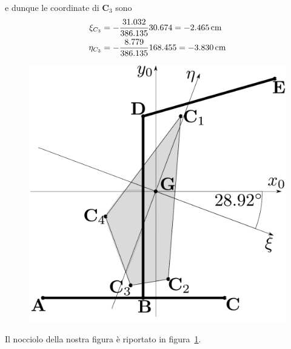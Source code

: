 e dunque le coordinate di $\mathbf{C}_3$ sono 
\begin{align*}
\xi_{C_{3}} &= -\frac{31.032}{386.135}30.674 = -2.465\,\textup{cm} \\ 
\eta_{C_{3}} &= -\frac{8.779}{386.135}168.455 = -3.830\,\textup{cm}
\end{align*}
\renewcommand{\thefigure}{6.1~-~3}
\begin{figure}[ht]
\centering
\includegraphics[width=\textwidth]{Immagini/Parte_6/Esercizio6_1/Esercizio6_1_3.pdf}
\caption{}
\label{Esercizio6-1-3}
\end{figure}
Il nocciolo della nostra figura è riportato in figura~\ref{Esercizio6-1-3}.
